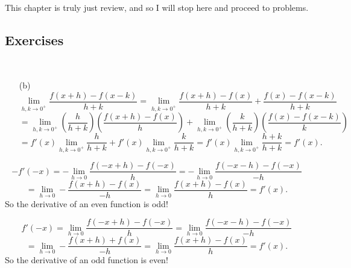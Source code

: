 This chapter is truly just review, and so I will stop here and proceed to problems.

\subsection{Exercises}
\begin{problem}[9-22] \ 
\begin{enumerate}
\item[(b)]
\[ \lim_{h,k \to 0^+} \frac{f(x+h) - f(x-k)}{h+k} = \lim_{h,k \to 0^+} \frac{f(x+h) - f(x)}{h + k} + \frac{f(x) - f(x-k)}{h + k} \]
\[ = \lim_{h,k \to 0^+} \left(\frac h{h+k}\right) \left(\frac{f(x+h) - f(x)}{h}\right) + \lim_{h,k \to 0^+} \left(\frac k{h+k}\right) \left(\frac{f(x) - f(x-k)}{k}\right) \]
\[ = f'(x) \lim_{h,k \to 0^+} \frac{h}{h + k} + f'(x) \lim_{h,k \to 0^+} \frac{k}{h + k} = f'(x) \lim_{h,k \to 0^+} \frac{h + k}{h + k} = f'(x). \]
\end{enumerate}
\end{problem}

\begin{problem}[9-23]
\[ -f'(-x) = -\lim_{h \to 0} \frac{f(-x+h) - f(-x)}{h} = -\lim_{h \to 0} \frac{f(-x-h) - f(-x)}{-h} \]
\[ = \lim_{h \to 0} -\frac{f(x+h) - f(x)}{-h} = \lim_{h \to 0} \frac{f(x+h) - f(x)}{h} = f'(x). \]
So the derivative of an even function is odd!
\end{problem}

\begin{problem}[9-24]
\[ f'(-x) = \lim_{h \to 0} \frac{f(-x+h) - f(-x)}{h} = \lim_{h \to 0} \frac{f(-x-h) - f(-x)}{-h} \]
\[ = \lim_{h \to 0} -\frac{f(x+h) + f(x)}{-h} = \lim_{h \to 0} \frac{f(x+h) - f(x)}{h} = f'(x). \]
So the derivative of an odd function is even!
\end{problem}




